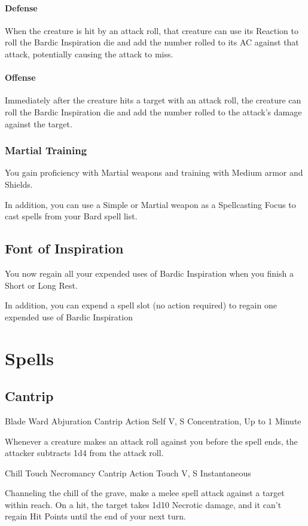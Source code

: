 \documentclass[letterpaper,openany,oneside,twocolumn]{book}
\begin{document}
\paragraph*{Defense} When the creature is hit by an attack roll, that creature can use its Reaction to roll the Bardic Inspiration die and add the number rolled to its AC against that attack, potentially causing the attack to miss.
\paragraph*{Offense} Immediately after the creature hits a target with an attack roll, the creature can roll the Bardic Inspiration die and add the number rolled to the attack's damage against the target.
\subsubsection*{Martial Training}
You gain proficiency with Martial weapons and training with Medium armor and Shields.

In addition, you can use a Simple or Martial weapon as a Spellcasting Focus to cast spells from your Bard spell list.

\subsection*{Font of Inspiration}
You now regain all your expended uses of Bardic Inspiration when you finish a Short or Long Rest.

In addition, you can expend a spell slot (no action required) to regain one expended use of Bardic Inspiration

\section*{Spells}
\subsection*{Cantrip}

\DndSpellHeader
  {Blade Ward}
  {Abjuration Cantrip}
  {Action}
  {Self}
  {V, S}
  {Concentration, Up to 1 Minute}

Whenever a creature makes an attack roll against you before the spell ends, the attacker subtracts 1d4 from the attack roll.

\DndSpellHeader
  {Chill Touch}
  {Necromancy Cantrip}
  {Action}
  {Touch}
  {V, S}
  {Instantaneous}

Channeling the chill of the grave, make a melee spell attack against a target within reach. On a hit, the target takes 1d10 Necrotic damage, and it can't regain Hit Points until the end of your next turn.
\end{document}
